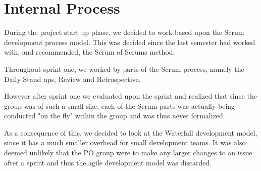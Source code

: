 \section{Internal Process}\label{SEC:InternalProcess1}
During the project start up phase, we decided to work based upon the Scrum development process model.
This was decided since the last semester had worked with, and recommended, the Scrum of Scrums method.

Throughout sprint one, we worked by parts of the Scrum process, namely the Daily Stand ups, Review and Retrospective.

However after sprint one we evaluated upon the sprint and realized that since the group was of such a small size, each of the Scrum parts was actually being conducted "on the fly" within the group and was thus never formalized.

As a consequence of this, we decided to look at the Waterfall development model, since it has a much smaller overhead for small development teams.
It was also deemed unlikely that the PO group were to make any larger changes to an issue after a sprint and thus the agile development model was discarded.

